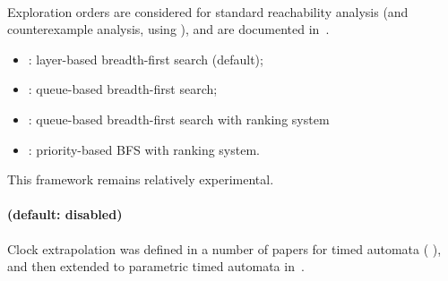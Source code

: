 \paragraph{ } %
Exploration orders are considered for standard reachability analysis (and counterexample analysis, using ), and are documented in~\cite{ANP17}.
\begin{itemize}
	\item {}: layer-based breadth-first search (default);
	\item {}: queue-based breadth-first search;
	\item {}: queue-based breadth-first search with ranking system
	\item {}: priority-based BFS with ranking system.
\end{itemize}
%
This framework remains relatively experimental.



\paragraph{ (default: disabled)}
Clock extrapolation was defined in a number of papers for timed automata (\eg{} \cite{BBFL03,BBLP06,Li09,Tripakis09}), and then extended to parametric timed automata in~\cite{ALR15,AA22}.

